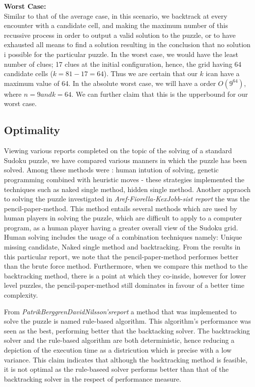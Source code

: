 \documentclass[12pt]{article}
\begin{document}
\begin{flushleft}
\textbf{Worst Case:}\\
Similar to that of the average case, in this scenario, we backtrack at every encounter with a candidate cell, and making the maximum number of this recussive process in order to output a valid solution to the puzzle, or to have exhausted all means to find a solution resulting in the conclusion that no solution i possible for the particular puzzle. In the worst case, we would have the least number of clues; 17 clues at the initial configuration, hence, the grid having 64 candidate cells ($k = 81-17 = 64$). Thus we are certain that our $k$ ican have a maximum value of 64. In the absolute worst case, we will have a order $O(9^64)$, where $n = 9 and k = 64$. We can further claim that this is the upperbound for our worst case.  
\end{flushleft}
\subsection{Optimality}
\begin{flushleft}
Viewing various reports completed on the topic of the solving of a standard Sudoku puzzle, we have compared various manners in which the puzzle has been solved. 
Among these methods were : human intution of solving, genetic programming combined with heuristic moves - these strategies implemented the techniques such as naked single method, hidden single method. 
Another appraoch to solving the puzzle investigated in \textsl{Aref-Fiorella-KexJobb-sist report} the  was the pencil-paper-method. This method entails several methods which are used by human players in solving the puzzle, which are difficult to apply to a computer program, as a human player having a greater overall view of the Sudoku grid. Human solving includes the usage of a combination techniques namely: Unique missing candidate, Naked single method and backtracking. From the results in this particular report, we note that the pencil-paper-method performes better than the brute force method. Furthermore, when we compare this method to the backtracking method, there is a point at which they co-inside, however for lower level puzzles, the pencil-paper-method still dominates in favour of a better time complexity. 
\end{flushleft}

\begin{flushleft}
From \textit{PatrikBerggrenDavidNilsson'sreport} a method that was implemented to solve the puzzle is named rule-based algorithm. This algorithm's performance was seen as the best, performing better that the backtacking solver. The backtracking solver and the rule-based algorithm are both deterministic, hence reducing a depiction of the execution time as a districution which is precise with a low variance. This claim indicates that although the backtracking method is feasible, it is not optimal as the rule-baseed solver performs better than that of the backtracking solver in the respect of performance measure. 
\end{flushleft}
\end{document}
